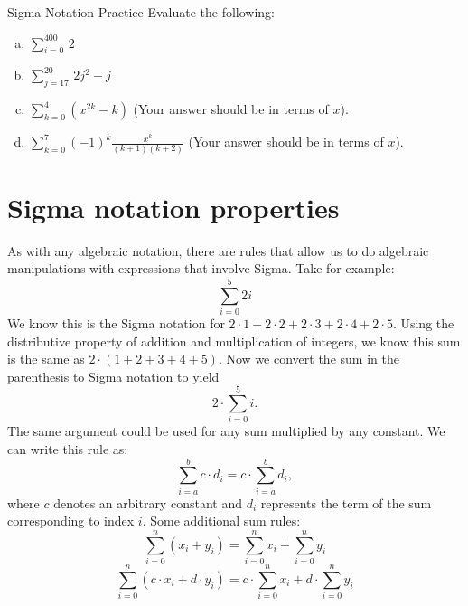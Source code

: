 \begin{exercise}{Sigma Notation Practice}
Evaluate the following:
\begin {enumerate}[(a)]
\item
$\displaystyle{\sum _{i=0}^{400} \,2}$
\item
$\displaystyle{ \sum_{j=17}^{20} \, 2j^2 - j}$
\item
$\displaystyle{ \sum_{k=0}^{4}(x^{2k} - k)}$  \quad (Your answer should be in terms of  $x$).
\item
$\displaystyle{ \sum_{k=0}^{7} (-1)^k\frac{x^{k}}{(k+1)(k+2)}}$ \quad  (Your answer should be in terms of $x$).
\end {enumerate}
\end{exercise}

\section{Sigma notation properties}

As with any algebraic notation, there are rules that allow us to do algebraic manipulations with expressions that involve Sigma. 
Take for example:
\[\sum_{i=0}^{5}2i\]
We know this is the Sigma notation for $2\cdot1+2\cdot2+2\cdot3+2\cdot4+2\cdot5$. Using the distributive property of addition and multiplication of integers, we know this sum is the same as $2\cdot(1+2+3+4+5)$.  Now we convert the sum in the parenthesis to Sigma notation to yield
\[2\cdot\sum_{i=0}^{5}i.\]
The same argument could be used for any sum  multiplied by any constant. We can write this rule as:
\[\sum_{i=a}^{b} c \cdot d_i = c \cdot \sum_{i=a}^{b}  d_i,\]
where $c$ denotes an arbitrary constant and $d_i$ represents the term of the sum corresponding to index $i$.
Some additional sum rules:
\[ \sum_{i=0}^n \left(x_i +y_i \right) = \sum_{i=0}^n x_i + \sum_{i=0}^n y_i \]
\[ \sum_{i=0}^n \left(c \cdot x_i + d \cdot y_i \right) = c \cdot \sum_{i=0}^n x_i + d \cdot \sum_{i=0}^n y_i \]


